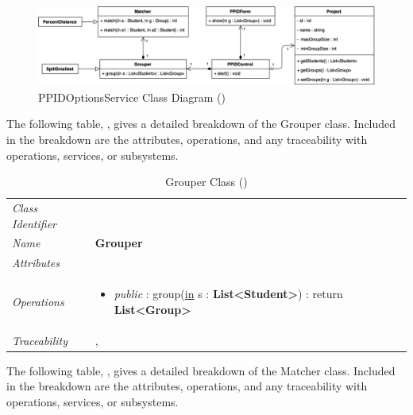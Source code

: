 \documentclass[12pt,letterpaper]{article}
\begin{document}
\begin{figure}[H]
	\centering{}
	\includegraphics[scale=0.27]{imgs/d3/interfaces/ppid-options.png}
	\caption{PPIDOptionsService Class Diagram ()}
\end{figure}

The following table, , gives a detailed breakdown of the Grouper class. Included in the breakdown are the attributes, operations, and any traceability with operations, services, or subsystems.

\begin{table}[H]
    \caption{Grouper Class ()} 
	\begin{tabu} to 
		\toprule
		Class Identifier &  \\
		Name & {\bf Grouper} \\
		Attributes & \\

		Operations &
		\begin{minipage}[t]{\linewidth}
			\begin{itemize}
			    \item {\it public} : group(\underline{in} s : {\bf List<Student>}) : return {\bf List<Group>}
	        \end{itemize}
	    \end{minipage} \\
	    	Traceability & , \\
		\toprule
	\end{tabu}
\end{table}

The following table, , gives a detailed breakdown of the Matcher class. Included in the breakdown are the attributes, operations, and any traceability with operations, services, or subsystems.
\end{document}
